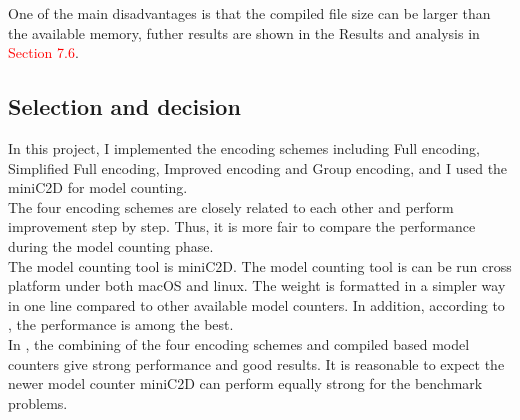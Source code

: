     One of the main disadvantages is that the compiled file size can be larger than the available memory, futher results are shown in the Results and analysis in \textcolor{red}{Section 7.6}.
    
    \subsection{Selection and decision}
    In this project, I implemented the encoding schemes including Full encoding, Simplified Full encoding, Improved encoding and Group encoding, and I used the miniC2D for model counting. \\
    
    The four encoding schemes are closely related to each other and perform improvement step by step. Thus, it is more fair to compare the performance during the model counting phase.\\
    
    The model counting tool is miniC2D. The model counting tool is can be run cross platform under both macOS and linux. The weight is formatted in a simpler way in one line compared to other available model counters. In addition, according to \cite{minic2d}, the performance is among the best.\\
    
    In \cite{2008-literature-review}, the combining of the four encoding schemes and compiled based model counters give strong performance and good results. It is reasonable to expect the newer model counter miniC2D can perform equally strong for the benchmark problems.
    
    
